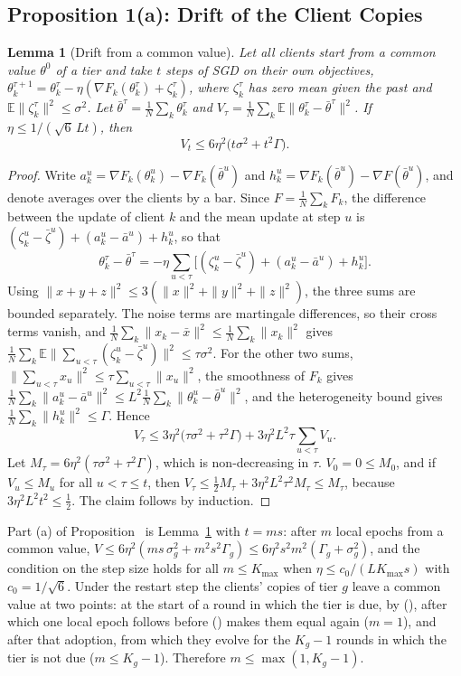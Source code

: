 \documentclass[journal]{IEEEtran}
\newtheorem{lemma}{Lemma}
\begin{document}
\subsection{Proposition 1(a): Drift of the Client Copies}
\begin{lemma}[Drift from a common value]
\label{lem:drift}
Let all clients start from a common value $\theta^0$ of a tier and take $t$ steps of SGD on their own objectives, $\theta_k^{\tau+1}=\theta_k^\tau-\eta(\nabla F_k(\theta_k^\tau)+\zeta_k^\tau)$, where $\zeta_k^\tau$ has zero mean given the past and $\mathbb E\|\zeta_k^\tau\|^2\le\sigma^2$. Let $\bar\theta^\tau=\frac1N\sum_k\theta_k^\tau$ and $V_\tau=\frac1N\sum_k\mathbb E\|\theta_k^\tau-\bar\theta^\tau\|^2$. If $\eta\le1/(\sqrt6\,Lt)$, then
\begin{equation}
V_t\le6\eta^2\big(t\sigma^2+t^2\Gamma\big).
\label{eq:s-drift}
\end{equation}
\end{lemma}
\begin{proof}
Write $a_k^u=\nabla F_k(\theta_k^u)-\nabla F_k(\bar\theta^u)$ and $h_k^u=\nabla F_k(\bar\theta^u)-\nabla F(\bar\theta^u)$, and denote averages over the clients by a bar. Since $F=\frac1N\sum_kF_k$, the difference between the update of client $k$ and the mean update at step $u$ is $(\zeta_k^u-\bar\zeta^u)+(a_k^u-\bar a^u)+h_k^u$, so that
\[
\theta_k^\tau-\bar\theta^\tau=-\eta\sum_{u<\tau}\big[(\zeta_k^u-\bar\zeta^u)+(a_k^u-\bar a^u)+h_k^u\big].
\]
Using $\|x+y+z\|^2\le3(\|x\|^2+\|y\|^2+\|z\|^2)$, the three sums are bounded separately. The noise terms are martingale differences, so their cross terms vanish, and $\frac1N\sum_k\|x_k-\bar x\|^2\le\frac1N\sum_k\|x_k\|^2$ gives $\frac1N\sum_k\mathbb E\|\sum_{u<\tau}(\zeta_k^u-\bar\zeta^u)\|^2\le\tau\sigma^2$. For the other two sums, $\|\sum_{u<\tau}x_u\|^2\le\tau\sum_{u<\tau}\|x_u\|^2$, the smoothness of $F_k$ gives $\frac1N\sum_k\|a_k^u-\bar a^u\|^2\le L^2\frac1N\sum_k\|\theta_k^u-\bar\theta^u\|^2$, and the heterogeneity bound gives $\frac1N\sum_k\|h_k^u\|^2\le\Gamma$. Hence
\[
V_\tau\le3\eta^2\big(\tau\sigma^2+\tau^2\Gamma\big)+3\eta^2L^2\tau\sum_{u<\tau}V_u .
\]
Let $M_\tau=6\eta^2(\tau\sigma^2+\tau^2\Gamma)$, which is non-decreasing in $\tau$. $V_0=0\le M_0$, and if $V_u\le M_u$ for all $u<\tau\le t$, then $V_\tau\le\frac12M_\tau+3\eta^2L^2\tau^2M_\tau\le M_\tau$, because $3\eta^2L^2t^2\le\frac12$. The claim follows by induction.
\end{proof}
Part (a) of Proposition~ is Lemma~\ref{lem:drift} with $t=ms$: after $m$ local epochs from a common value, $V\le6\eta^2(ms\,\sigma_g^2+m^2s^2\Gamma_g)\le6\eta^2s^2m^2(\Gamma_g+\sigma_g^2)$, and the condition on the step size holds for all $m\le K_{\max}$ when $\eta\le c_0/(LK_{\max}s)$ with $c_0=1/\sqrt6$. Under the restart step the clients' copies of tier $g$ leave a common value at two points: at the start of a round in which the tier is due, by (), after which one local epoch follows before () makes them equal again ($m=1$), and after that adoption, from which they evolve for the $K_g-1$ rounds in which the tier is not due ($m\le K_g-1$). Therefore $m\le\max(1,K_g-1)$.
\end{document}
